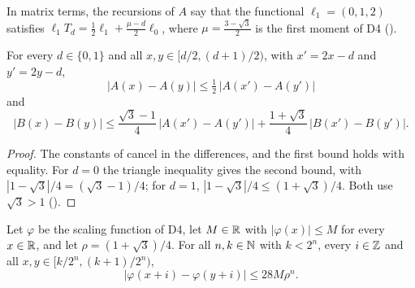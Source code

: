 In matrix terms, the recursions of $A$ say that the functional $\ell_1 = (0, 1, 2)$ satisfies
$\ell_1 T_d = \frac12 \ell_1 + \frac{\mu - d}{2} \ell_0$, where $\mu = \frac{3 - \sqrt 3}{2}$ is
the first moment of D4 ().

\begin{lemma}
\label{lem:daub-d4-difference-recursions}
\leanok
{}
For every $d \in \{0, 1\}$ and all $x, y \in [d/2, (d+1)/2)$, with $x' = 2x - d$ and
$y' = 2y - d$,
\[
  |A(x) - A(y)| \leq \tfrac12 \, |A(x') - A(y')|
\]
and
\[
  |B(x) - B(y)| \leq \frac{\sqrt 3 - 1}{4} \, |A(x') - A(y')|
    + \frac{1 + \sqrt 3}{4} \, |B(x') - B(y')| .
\]
\end{lemma}

\begin{proof}
\leanok
{}
The constants of  cancel in the differences, and the first bound
holds with equality. For $d = 0$ the triangle inequality gives the second bound, with
$|1 - \sqrt 3|/4 = (\sqrt 3 - 1)/4$; for $d = 1$, $|1 - \sqrt 3|/4 \leq (1 + \sqrt 3)/4$. Both
use $\sqrt 3 > 1$ ().
\end{proof}

\begin{proposition}
\label{prop:daub-d4-oscillation}
\leanok
{}
Let $\varphi$ be the scaling function of D4, let $M \in \mathbb{R}$ with $|\varphi(x)| \leq M$ for every
$x \in \mathbb{R}$, and let $\rho = (1 + \sqrt 3)/4$. For all $n, k \in \mathbb{N}$ with $k < 2^n$, every
$i \in \mathbb{Z}$ and all $x, y \in [k/2^n, (k+1)/2^n)$,
\[
  |\varphi(x + i) - \varphi(y + i)| \leq 28 M \rho^n .
\]
\end{proposition}

